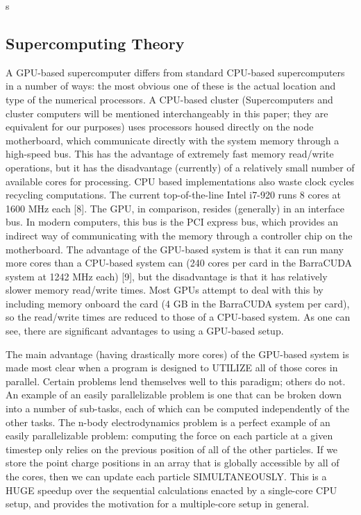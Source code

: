 s\documentclass[10pt]{article}
\begin{document}
\subsection{Supercomputing Theory}
A GPU-based supercomputer differs from standard CPU-based supercomputers in a number of ways: the most obvious one of these is the actual location and type of the numerical processors. A CPU-based cluster (Supercomputers and cluster computers will be mentioned interchangeably in this paper; they are equivalent for our purposes) uses processors housed directly on the node motherboard, which communicate directly with the system memory through a high-speed bus. This has the advantage of extremely fast memory read/write operations, but it has the disadvantage (currently) of a relatively small number of available cores for processing. CPU based implementations also waste clock cycles recycling computations. The current top-of-the-line Intel i7-920 runs 8 cores at 1600 MHz each [8]. The GPU, in comparison, resides (generally) in an interface bus. In modern computers, this bus is the PCI express bus, which provides an indirect way of communicating with the memory through a controller chip on the motherboard. The advantage of the GPU-based system is that it can run many more cores than a CPU-based system can (240 cores per card in the BarraCUDA system at 1242 MHz each) [9], but the disadvantage is that it has relatively slower memory read/write times. Most GPUs attempt to deal with this by including memory onboard the card (4 GB in the BarraCUDA system per card), so the read/write times are reduced to those of a CPU-based system. As one can see, there are significant advantages to using a GPU-based setup.

The main advantage (having drastically more cores) of the GPU-based system is made most clear when a program is designed to UTILIZE all of those cores in parallel. Certain problems lend themselves well to this paradigm; others do not. An example of an easily parallelizable problem is one that can be broken down into a number of sub-tasks, each of which can be computed independently of the other tasks. The n-body electrodynamics problem is a perfect example of an easily parallelizable problem: computing the force on each particle at a given timestep only relies on the previous position of all of the other particles. If we store the point charge positions in an array that is globally accessible by all of the cores, then we can update each particle SIMULTANEOUSLY. This is a HUGE speedup over the sequential calculations enacted by a single-core CPU setup, and provides the motivation for a multiple-core setup in general.
\end{document}
